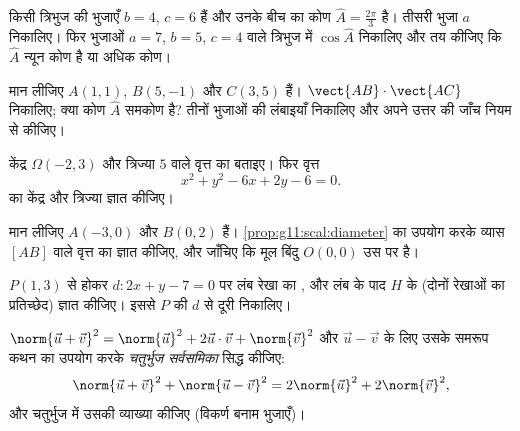 \begin{exercise}[$\star\star$]\label{exo:g11:scal:5}
किसी त्रिभुज की भुजाएँ $b = 4$, $c = 6$ हैं और उनके बीच का कोण $\widehat A = \frac{2\pi}{3}$ है। तीसरी
भुजा $a$ निकालिए। फिर भुजाओं $a = 7$, $b = 5$, $c = 4$ वाले त्रिभुज में $\cos\widehat A$
निकालिए और तय कीजिए कि $\widehat A$ न्यून कोण है या अधिक कोण।
\end{exercise}

\begin{exercise}[$\star\star$]\label{exo:g11:scal:6}
मान लीजिए $A(1, 1)$, $B(5, -1)$ और $C(3, 5)$ हैं। $\vect{AB} \cdot \vect{AC}$ निकालिए; क्या कोण $\widehat A$ समकोण है?
तीनों भुजाओं की लंबाइयाँ निकालिए और अपने उत्तर की जाँच  नियम से कीजिए।
\end{exercise}

\begin{exercise}[$\star\star$]\label{exo:g11:scal:7}
केंद्र $\Omega(-2, 3)$ और त्रिज्या $5$ वाले वृत्त का  बताइए। फिर वृत्त
\[
x^2 + y^2 - 6x + 2y - 6 = 0 .
\]
का केंद्र और त्रिज्या ज्ञात कीजिए।
\end{exercise}

\begin{exercise}[$\star\star$]\label{exo:g11:scal:8}
मान लीजिए $A(-3, 0)$ और $B(0, 2)$ हैं। \cref{prop:g11:scal:diameter} का उपयोग करके व्यास $[AB]$ वाले वृत्त का
 ज्ञात कीजिए, और जाँचिए कि मूल बिंदु $O(0,0)$ उस पर है।
\end{exercise}

\begin{exercise}[$\star\star$]\label{exo:g11:scal:9}
$P(1, 3)$ से होकर $d : 2x + y - 7 = 0$ पर लंब रेखा का , और लंब के पाद $H$ के 
(दोनों रेखाओं का प्रतिच्छेद) ज्ञात कीजिए। इससे $P$ की $d$ से दूरी
निकालिए।
\end{exercise}

\begin{exercise}[$\star\star$]\label{exo:g11:scal:10}
$\norm{\vec u + \vec v}^2 = \norm{\vec u}^2 + 2\vec u\cdot\vec v +
\norm{\vec v}^2$ और $\vec u - \vec v$ के लिए उसके समरूप कथन का उपयोग करके \emph{ चतुर्भुज
सर्वसमिका} सिद्ध कीजिए:
\[
\norm{\vec u + \vec v}^2 + \norm{\vec u - \vec v}^2
= 2\norm{\vec u}^2 + 2\norm{\vec v}^2 ,
\]
और  चतुर्भुज में उसकी व्याख्या कीजिए (विकर्ण बनाम भुजाएँ)।
\end{exercise}


